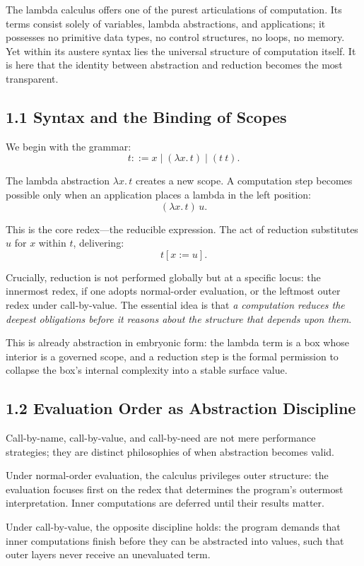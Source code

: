 \documentclass[12pt,letterpaper]{article}
\begin{document}
The lambda calculus offers one of the purest articulations of computation. Its terms consist solely of variables, lambda abstractions, and applications; it possesses no primitive data types, no control structures, no loops, no memory. Yet within its austere syntax lies the universal structure of computation itself. It is here that the identity between abstraction and reduction becomes the most transparent.

\subsection{1.1 Syntax and the Binding of Scopes}

We begin with the grammar:
\[
t ::= x \mid (\lambda x.\, t) \mid (t~t).
\]

The lambda abstraction \(\lambda x.\, t\) creates a new scope. A computation step becomes possible only when an application places a lambda in the left position:
\[
(\lambda x.\, t)\, u.
\]

This is the core redex---the reducible expression. The act of reduction substitutes \(u\) for \(x\) within \(t\), delivering:
\[
t[x := u].
\]

Crucially, reduction is not performed globally but at a specific locus: the innermost redex, if one adopts normal-order evaluation, or the leftmost outer redex under call-by-value. The essential idea is that \emph{a computation reduces the deepest obligations before it reasons about the structure that depends upon them}.

This is already abstraction in embryonic form: the lambda term is a box whose interior is a governed scope, and a reduction step is the formal permission to collapse the box’s internal complexity into a stable surface value.

\subsection{1.2 Evaluation Order as Abstraction Discipline}

Call-by-name, call-by-value, and call-by-need are not mere performance strategies; they are distinct philosophies of when abstraction becomes valid.

Under normal-order evaluation, the calculus privileges outer structure: the evaluation focuses first on the redex that determines the program’s outermost interpretation. Inner computations are deferred until their results matter.

Under call-by-value, the opposite discipline holds: the program demands that inner computations finish before they can be abstracted into values, such that outer layers never receive an unevaluated term.
\end{document}
